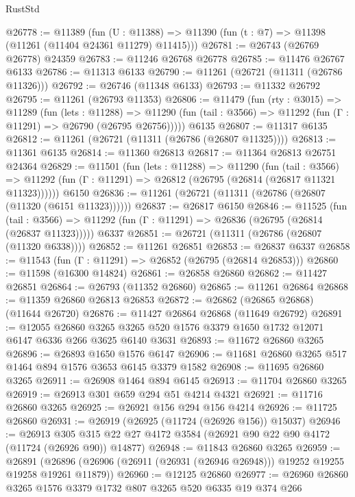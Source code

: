 \begin{lexlean}{RustStd}
\begin{coremodule}
@26778 := @11389
    (fun (U : @11388) => @11390 (fun (t : @7) => @11398 (@11261 (@11404 @24361 @11279) @11415)))
@26781 := @26743 (@26769 @26778) @24359
@26783 := @11246 @26768 @26778
@26785 := @11476 @26767 @6133
@26786 := @11313 @6133
@26790 := @11261 (@26721 (@11311 (@26786 @11326)))
@26792 := @26746 (@11348 @6133)
@26793 := @11332 @26792
@26795 := @11261 (@26793 @11353)
@26806 := @11479
    (fun (rty : @3015) =>
    @11289
      (fun (lets : @11288) =>
      @11290 (fun (tail : @3566) => @11292 (fun (Γ : @11291) => @26790 (@26795 @26756)))))
    @6135
@26807 := @11317 @6135
@26812 := @11261 (@26721 (@11311 (@26786 (@26807 @11325))))
@26813 := @11361 @6135
@26814 := @11360 @26813
@26817 := @11364 @26813 @26751 @24364
@26829 := @11501
    (fun (lets : @11288) =>
    @11290
      (fun (tail : @3566) =>
      @11292 (fun (Γ : @11291) => @26812 (@26795 (@26814 (@26817 @11321 @11323))))))
    @6150
@26836 := @11261 (@26721 (@11311 (@26786 (@26807 (@11320 (@6151 @11323))))))
@26837 := @26817 @6150
@26846 := @11525
    (fun (tail : @3566) => @11292 (fun (Γ : @11291) => @26836 (@26795 (@26814 (@26837 @11323)))))
    @6337
@26851 := @26721 (@11311 (@26786 (@26807 (@11320 @6338))))
@26852 := @11261 @26851
@26853 := @26837 @6337
@26858 := @11543 (fun (Γ : @11291) => @26852 (@26795 (@26814 @26853)))
@26860 := @11598 (@16300 @14824)
@26861 := @26858 @26860
@26862 := @11427 @26851
@26864 := @26793 (@11352 @26860)
@26865 := @11261 @26864
@26868 := @11359 @26860 @26813 @26853
@26872 := @26862 (@26865 @26868) (@11644 @26720)
@26876 := @11427 @26864 @26868 (@11649 @26792)
@26891 := @12055
    @26860
    @3265
    @3265
    @520
    @1576
    @3379
    @1650
    @1732
    @12071
    @6147
    @6336
    @266
    @3625
    @6140
    @3631
@26893 := @11672 @26860 @3265
@26896 := @26893 @1650 @1576 @6147
@26906 := @11681 @26860 @3265 @517 @1464 @894 @1576 @3653 @6145 @3379 @1582
@26908 := @11695 @26860 @3265
@26911 := @26908 @1464 @894 @6145
@26913 := @11704 @26860 @3265
@26919 := @26913 @301 @659 @294 @51 @4214 @4321
@26921 := @11716 @26860 @3265
@26925 := @26921 @156 @294 @156 @4214
@26926 := @11725 @26860
@26931 := @26919 (@26925 (@11724 (@26926 @156)) @15037)
@26946 := @26913
    @305
    @315
    @22
    @27
    @4172
    @3584
    (@26921 @90 @22 @90 @4172 (@11724 (@26926 @90)) @14877)
@26948 := @11843 @26860 @3265
@26959 := @26891
    (@26896 (@26906 (@26911 (@26931 (@26946 @26948))) @19252 @19255 @19258 @19261 @11879))
@26960 := @12125 @26860
@26977 := @26960
    @26860
    @3265
    @1576
    @3379
    @1732
    @807
    @3265
    @520
    @6335
    @19
    @374
    @266

\end{coremodule}
\end{lexlean}

